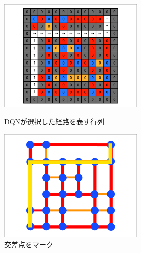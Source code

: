\begin{figure}[htbp]
    \begin{minipage}{0.5\hsize}
        \begin{center}
            \includegraphics[width=70mm]{assets/action_vector.eps}
        \end{center}
        \caption{DQNが選択した経路を表す行列}
        \label{out:vector}
    \end{minipage}
    \begin{minipage}{0.5\hsize}
        \begin{center}
            \includegraphics[width=70mm]{assets/action_vector_visualize.eps}
        \end{center}
        \caption{交差点をマーク}
        \label{out:map}
    \end{minipage}
\end{figure}



